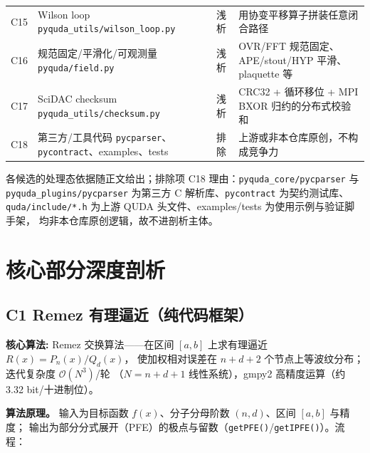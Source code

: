 \documentclass[UTF8]{ctexart}
\begin{document}
\begin{xltabular}{\textwidth}{lXlX}
C15 & Wilson loop \texttt{\nolinkurl{pyquda_utils/wilson_loop.py}} & 浅析 & 用协变平移算子拼装任意闭合路径 \\
C16 & 规范固定/平滑化/可观测量 \texttt{\nolinkurl{pyquda/field.py}} & 浅析 & OVR/FFT 规范固定、APE/stout/HYP 平滑、plaquette 等 \\
C17 & SciDAC checksum \texttt{\nolinkurl{pyquda_utils/checksum.py}} & 浅析 & CRC32 + 循环移位 + MPI BXOR 归约的分布式校验和 \\
C18 & 第三方/工具代码 \texttt{\nolinkurl{pycparser}}、\texttt{\nolinkurl{pycontract}}、examples、tests & 排除 & 上游或非本仓库原创，不构成竞争力 \\
\bottomrule
\end{xltabular}

各候选的处理态依据随正文给出；排除项 C18 理由：\texttt{\nolinkurl{pyquda_core/pycparser}} 与
\texttt{\nolinkurl{pyquda_plugins/pycparser}} 为第三方 C 解析库、\texttt{\nolinkurl{pycontract}} 为契约测试库、
\texttt{\nolinkurl{quda/include/*.h}} 为上游 QUDA 头文件、examples/tests 为使用示例与验证脚手架，
均非本仓库原创逻辑，故不进剖析主体。

\section{核心部分深度剖析}

\subsection{C1 Remez 有理逼近（纯代码框架）}

\begin{algobox}
\textbf{核心算法:} Remez 交换算法——在区间 $[a,b]$ 上求有理逼近 $R(x) = P_n(x)/Q_d(x)$，
使加权相对误差在 $n+d+2$ 个节点上等波纹分布；迭代复杂度 $\mathcal{O}(N^3)$/轮
（$N=n+d+1$ 线性系统），gmpy2 高精度运算（约 3.32 bit/十进制位）。
\end{algobox}

\textbf{算法原理。} 输入为目标函数 $f(x)$、分子分母阶数 $(n,d)$、区间 $[a,b]$ 与精度；
输出为部分分式展开（PFE）的极点与留数（\texttt{getPFE()}/\texttt{getIPFE()}）。流程：
\end{document}
